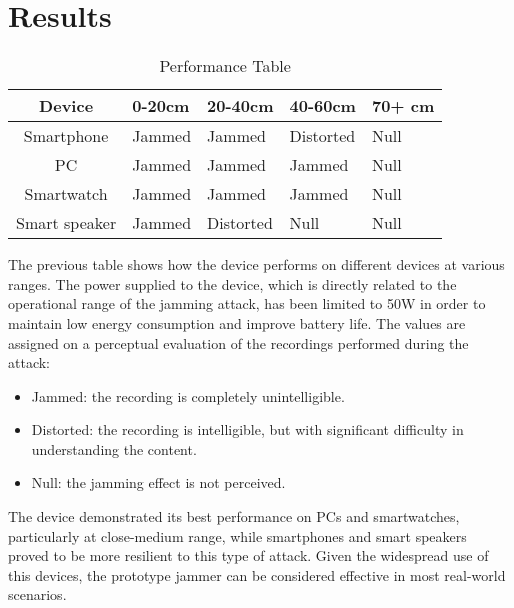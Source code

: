 \chapter{Results}
\begin{table}[H]
    \center
    \begin{tabular}{|c|l|l|l|l|}
    \hline
    Device     & 0-20cm & 20-40cm & 40-60cm & 70+ cm \\ \hline
    Smartphone & Jammed  & Jammed  & Distorted & Null  \\ \hline
    PC         & Jammed  & Jammed & Jammed & Null \\ \hline
    Smartwatch &  Jammed  & Jammed & Jammed & Null \\ \hline
    Smart speaker & Jammed & Distorted & Null & Null \\ \hline
    \end{tabular}
    \caption{Performance Table}
\end{table}
The previous table shows how the device performs on different devices at various ranges.
The power supplied to the device, which is directly related to the operational range of the jamming attack, has been limited to 50W in order to maintain low energy consumption and improve battery life.
The values are assigned on a perceptual evaluation of the recordings performed during the attack:
\begin{itemize}
    \item Jammed: the recording is completely unintelligible.
    \item Distorted: the recording is intelligible, but with significant difficulty in understanding the content.
    \item Null: the jamming effect is not perceived.
\end{itemize}
The device demonstrated its best performance on PCs and smartwatches, particularly at close-medium range, while smartphones and smart speakers proved to be more resilient to this type of attack. 
Given the widespread use of this devices, the prototype jammer can be considered effective in most real-world scenarios.

